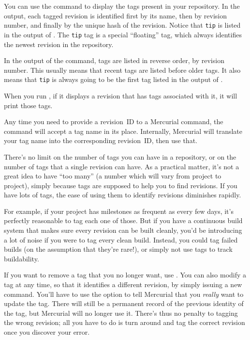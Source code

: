 You can use the  command to display the tags present in
your repository.  In the output, each tagged revision is identified
first by its name, then by revision number, and finally by the unique
hash of the revision.  
Notice that \texttt{tip} is listed in the output of .  The
\texttt{tip} tag is a special ``floating'' tag, which always
identifies the newest revision in the repository.

In the output of the  command, tags are listed in reverse
order, by revision number.  This usually means that recent tags are
listed before older tags.  It also means that \texttt{tip} is always
going to be the first tag listed in the output of .

When you run , if it displays a revision that has tags
associated with it, it will print those tags.

Any time you need to provide a revision~ID to a Mercurial command, the
command will accept a tag name in its place.  Internally, Mercurial
will translate your tag name into the corresponding revision~ID, then
use that.

There's no limit on the number of tags you can have in a repository,
or on the number of tags that a single revision can have.  As a
practical matter, it's not a great idea to have ``too many'' (a number
which will vary from project to project), simply because tags are
supposed to help you to find revisions.  If you have lots of tags, the
ease of using them to identify revisions diminishes rapidly.

For example, if your project has milestones as frequent as every few
days, it's perfectly reasonable to tag each one of those.  But if you
have a continuous build system that makes sure every revision can be
built cleanly, you'd be introducing a lot of noise if you were to tag
every clean build.  Instead, you could tag failed builds (on the
assumption that they're rare!), or simply not use tags to track
buildability.

If you want to remove a tag that you no longer want, use
.  
You can also modify a tag at any time, so that it identifies a
different revision, by simply issuing a new  command.
You'll have to use the  option to tell Mercurial that
you \emph{really} want to update the tag.
There will still be a permanent record of the previous identity of the
tag, but Mercurial will no longer use it.  There's thus no penalty to
tagging the wrong revision; all you have to do is turn around and tag
the correct revision once you discover your error.

